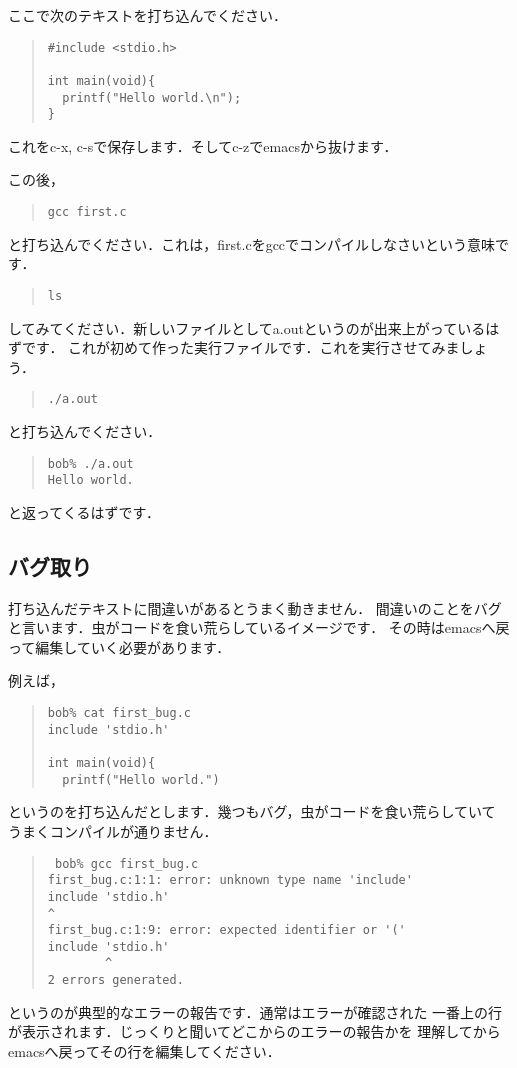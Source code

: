 \documentclass[12pt,a4paper]{jsarticle}
\begin{document}
ここで次のテキストを打ち込んでください．
\begin{quote}\begin{verbatim}
#include <stdio.h>

int main(void){
  printf("Hello world.\n");
}
\end{verbatim}\end{quote}
これをc-x, c-sで保存します．そしてc-zでemacsから抜けます．

この後，
\begin{quote}\begin{verbatim}
gcc first.c
\end{verbatim}\end{quote}
と打ち込んでください．これは，first.cをgccでコンパイルしなさいという意味です．
\begin{quote}\begin{verbatim}
ls
\end{verbatim}\end{quote}
してみてください．新しいファイルとしてa.outというのが出来上がっているはずです．
これが初めて作った実行ファイルです．これを実行させてみましょう．
\begin{quote}\begin{verbatim}
./a.out
\end{verbatim}\end{quote}
と打ち込んでください．
\begin{quote}\begin{verbatim}
bob% ./a.out
Hello world.
\end{verbatim}\end{quote}
と返ってくるはずです．

\subsection{バグ取り}
打ち込んだテキストに間違いがあるとうまく動きません．
間違いのことをバグと言います．虫がコードを食い荒らしているイメージです．
その時はemacsへ戻って編集していく必要があります．

例えば，
\begin{quote}\begin{verbatim}
bob% cat first_bug.c
include 'stdio.h'

int main(void){
  printf("Hello world.")

\end{verbatim}\end{quote}
というのを打ち込んだとします．幾つもバグ，虫がコードを食い荒らしていて
うまくコンパイルが通りません．
\begin{quote}\begin{verbatim}
 bob% gcc first_bug.c
first_bug.c:1:1: error: unknown type name 'include'
include 'stdio.h'
^
first_bug.c:1:9: error: expected identifier or '('
include 'stdio.h'
        ^
2 errors generated.
\end{verbatim}\end{quote}
というのが典型的なエラーの報告です．通常はエラーが確認された
一番上の行が表示されます．じっくりと聞いてどこからのエラーの報告かを
理解してからemacsへ戻ってその行を編集してください．
\end{document}
